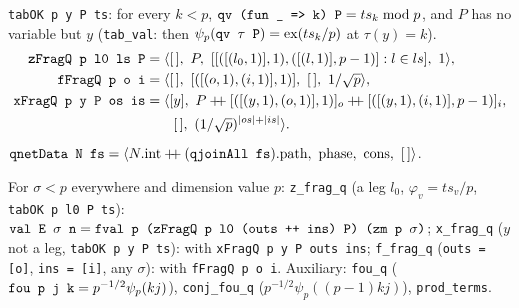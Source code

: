 \begin{definition}
\textnormal{\texttt{tabOK p y P ts}}: for every $k<p$, $\textnormal{\texttt{qv (\allowbreak{}fun \_\allowbreak{} => k) P}} = ts_k \bmod p$, and $P$ has no
variable but $y$ (\textnormal{\texttt{tab\_\allowbreak{}val}}: then $\psi_p(\textnormal{\texttt{qv \ensuremath{\tau} P}}) = \operatorname{ex}(ts_k/p)$ at
$\tau(y)=k$).
\begin{align*}
\textnormal{\texttt{zFragQ p l0 ls P}} &= \langle[\,],\ P,\ [[([(l_0,1)],1),([(l,1)],p-1)] : l\in ls],\ 1\rangle,\\
\textnormal{\texttt{fFragQ p o i}} &= \langle[\,],\ [([(o,1),(i,1)],1)],\ [\,],\ 1/\sqrt p\rangle,\\
\textnormal{\texttt{xFragQ p y P os is}} &= \langle[y],\ P\mathbin{+\!\!+}[([(y,1),(o,1)],1)]_{o}\mathbin{+\!\!+}[([(y,1),(i,1)],p-1)]_{i},\\
 &\qquad [\,],\ (1/\sqrt p)^{|os|+|is|}\rangle .
\end{align*}
$\textnormal{\texttt{qnetData N fs}} = \langle N.\text{int}\mathbin{+\!\!+}(\textnormal{\texttt{qjoinAll fs}}).\text{path},\ \text{phase},\ \text{cons},\ [\,]\rangle$.
\end{definition}

\begin{theorem}
For $\sigma<p$ everywhere and dimension value $p$:
\textnormal{\texttt{z\_\allowbreak{}frag\_\allowbreak{}q}} (a leg $l_0$, $\varphi_v = ts_v/p$, \textnormal{\texttt{tabOK p l0 P ts}}):
$\textnormal{\texttt{val E \ensuremath{\sigma} n}} = \textnormal{\texttt{fval p (\allowbreak{}zFragQ p l0 (\allowbreak{}outs ++ ins) P) (\allowbreak{}zm p \ensuremath{\sigma})}}$;
\textnormal{\texttt{x\_\allowbreak{}frag\_\allowbreak{}q}} ($y$ not a leg, \textnormal{\texttt{tabOK p y P ts}}): with \textnormal{\texttt{xFragQ p y P outs ins}};
\textnormal{\texttt{f\_\allowbreak{}frag\_\allowbreak{}q}} (\textnormal{\texttt{outs = [o]}}, \textnormal{\texttt{ins = [i]}}, any $\sigma$): with \textnormal{\texttt{fFragQ p o i}}.
Auxiliary: \textnormal{\texttt{fou\_\allowbreak{}q}} ($\textnormal{\texttt{fou p j k}} = p^{-1/2}\psi_p(kj)$), \textnormal{\texttt{conj\_\allowbreak{}fou\_\allowbreak{}q}}
($p^{-1/2}\psi_p((p-1)kj)$), \textnormal{\texttt{prod\_\allowbreak{}terms}}.
\end{theorem}

